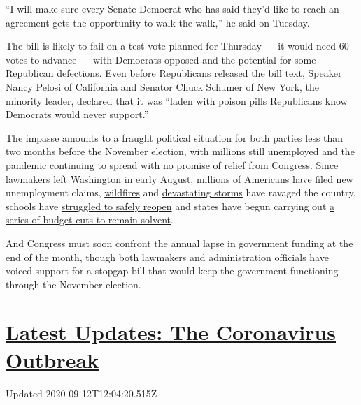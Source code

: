 ``I will make sure every Senate Democrat who has said they'd like to
reach an agreement gets the opportunity to walk the walk,'' he said on
Tuesday.

The bill is likely to fail on a test vote planned for Thursday --- it
would need 60 votes to advance --- with Democrats opposed and the
potential for some Republican defections. Even before Republicans
released the bill text, Speaker Nancy Pelosi of California and Senator
Chuck Schumer of New York, the minority leader, declared that it was
``laden with poison pills Republicans know Democrats would never
support.''

The impasse amounts to a fraught political situation for both parties
less than two months before the November election, with millions still
unemployed and the pandemic continuing to spread with no promise of
relief from Congress. Since lawmakers left Washington in early August,
millions of Americans have filed new unemployment claims,
\href{https://www.nytimes3xbfgragh.onion/2020/09/08/us/wildfires-live-updates.html?action=click\&module=Top\%20Stories\&pgtype=Homepage}{wildfires}
and
\href{https://www.nytimes3xbfgragh.onion/2020/08/30/us/hurricane-laura-damage.html}{devastating
storms} have ravaged the country, schools have
\href{https://www.nytimes3xbfgragh.onion/2020/08/12/us/georgia-school-coronavirus.html}{struggled
to safely reopen} and states have begun carrying out
\href{https://www.nytimes3xbfgragh.onion/2020/09/07/business/state-budgets-coronavirus-aid.html}{a
series of budget cuts to remain solvent}.

And Congress must soon confront the annual lapse in government funding
at the end of the month, though both lawmakers and administration
officials have voiced support for a stopgap bill that would keep the
government functioning through the November election.

\hypertarget{latest-updates-the-coronavirus-outbreak}{%
\section{\texorpdfstring{\href{https://www.nytimes3xbfgragh.onion/2020/09/11/world/covid-19-coronavirus.html?action=click\&pgtype=Article\&state=default\&region=MAIN_CONTENT_1\&context=storylines_live_updates}{Latest
Updates: The Coronavirus
Outbreak}}{Latest Updates: The Coronavirus Outbreak}}\label{latest-updates-the-coronavirus-outbreak}}

Updated 2020-09-12T12:04:20.515Z

